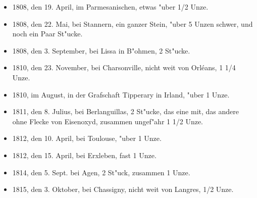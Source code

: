 \documentclass[a4paper, 11pt, oneside, polutonikogreek, german]{article}
\begin{document}
\begin{itemize}
    \item 1808, den 19. April, im Parmesanischen, etwas "uber 1/2 Unze.
    \item 1808, den 22. Mai, bei Stannern, ein ganzer Stein, "uber 5 Unzen schwer, und noch ein Paar St"ucke.
    \item 1808, den 3. September, bei Lissa in B"ohmen, 2 St"ucke.
    \item 1810, den 23. November, bei Charsonville, nicht weit von Orléans, 1 1/4 Unze.
    \item 1810, im August, in der Grafschaft Tipperary in Irland, "uber 1 Unze.
    \item 1811, den 8. Julius, bei Berlanguillas, 2 St"ucke, das eine mit, das andere ohne Flecke von Eisenoxyd, zusammen ungef"ahr 1 1/2 Unze.
    \item 1812, den 10. April, bei Toulouse, "uber 1 Unze.
    \item 1812, den 15. April, bei Erxleben, fast 1 Unze.
    \item 1814, den 5. Sept. bei Agen, 2 St"uck, zusammen 1 Unze.
    \item 1815, den 3. Oktober, bei Chassigny, nicht weit von Langres, 1/2 Unze.
\end{itemize}
\end{document}
